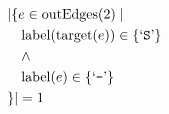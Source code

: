 \begin{align*}
&|\{e \in \mathrm{outEdges}(2)  \mid \\
&\quad \mathrm{label}(\mathrm{target}(e)) \in \{ \text{`\texttt{S}'} \}\\
&\quad \wedge\\
&\quad \mathrm{label}(e) \in \{ \text{`\texttt{-}'} \}\\
&\}| = 1
\end{align*}

